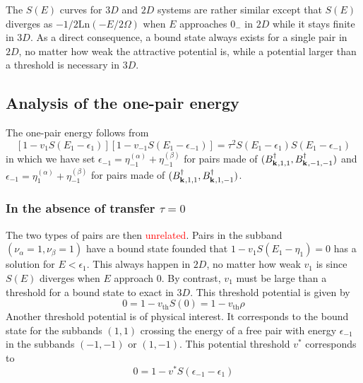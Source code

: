 \documentclass[11pt]{article} %
\newcommand{\ns}[1]{\textcolor{red}{#1}}
\begin{document}
The $S(E)$ curves for $3D$ and $2D$ systems are rather similar except that $S(E)$ diverges as $-1/2\text{Ln}(-E/2\Omega)$ when $E$ approaches $0_{-}$ in $2D$ while it stays finite in $3D$.  As a direct consequence, a bound state always exists for a single pair in $2D$, no matter how weak the attractive potential is, while a potential larger than a threshold is necessary in $3D$.

\subsection{Analysis of the one-pair energy}
The one-pair energy follows from 
\begin{equation}\label{eq:ssEq}
[1-v_{1}S(E_1-\epsilon_{1})][1-v_{-1}S(E_1-\epsilon_{-1})]
=\tau^2S(E_1-\epsilon_{1})S(E_1-\epsilon_{-1})
\end{equation}
in which we have set $\epsilon_{-1}=\eta_{-1}^{(\alpha)}+\eta_{-1}^{(\beta)}$ for pairs made of $(B^{\dagger}_{\mathbf{k}^{},1,1},B^{\dagger}_{\mathbf{k}^{},-1,-1})$ and $\epsilon_{-1}=\eta_{1}^{(\alpha)}+\eta_{-1}^{(\beta)}$ for pairs made of $(B^{\dagger}_{\mathbf{k}^{},1,1},B^{\dagger}_{\mathbf{k}^{},1,-1})$.

\subsubsection{In the absence of transfer $\tau=0$}
The two types of pairs are then \ns{unrelated}. Pairs in the subband $(\nu_{\alpha}=1,\nu_{\beta}=1)$ have a bound state founded that $1-v_{1}S(E_1-\eta_{1})=0$ has a solution for $E<\epsilon_{1}$.  This always happen in $2D$, no matter how weak $v_{1}$ is since $S(E)$ diverges when $E$ approach $0$. By contrast, $v_{1}$ must be large than a threshold for a bound state to exact in $3D$.  This threshold potential is given by 
\begin{equation}
0=1-v_{\text{th}}S(0)=1-v_{\text{th}}\rho
\end{equation}
Another threshold potential is of physical interest. It corresponds to the bound state for the subbands $(1,1)$ crossing the energy of a free pair with energy $\epsilon_{-1}$ in the subbands $(-1,-1)$ or $(1,-1)$.  This potential threshold $v^{*}$ corresponds to
\begin{equation}
0=1-v^{*}S(\epsilon_{-1}-\epsilon_{1})
\end{equation}
\end{document}
